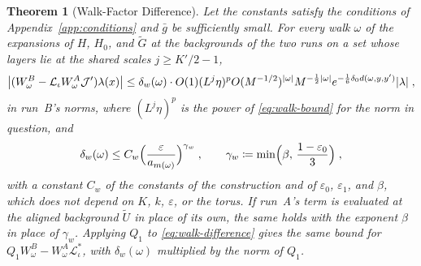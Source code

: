 \documentclass[11pt]{preprint}
\DeclarePairedDelimiter{\abs}{\lvert}{\rvert}
\numberwithin{equation}{section}
\newtheorem{theorem}{Theorem}[section]
\theoremstyle{definition}
\theoremstyle{remark}
\theoremstyle{plain}
\begin{document}
\begin{theorem}[Walk-Factor Difference]\label{thm:walk-difference}
Let the constants satisfy the conditions of Appendix~\ref{app:conditions} and $\bar g$ be sufficiently small. For every walk $\omega$ of the expansions of $H$, $H_0$, and $\tilde G$ at the backgrounds of the two runs on a set whose layers lie at the shared scales $j \geq K'/2 - 1$,
\begin{equation}\label{eq:walk-difference}
    \bigl\lvert(W^B_\omega - \mathcal L_\iota W^A_\omega\mathcal J')\lambda(x)\bigr\rvert \leq \delta_w(\omega)\cdot O(1)(L^j\eta)^pO(M^{-1/2})^{\abs{\omega}}M^{-\frac12\abs{\omega}}e^{-\frac16\delta_0d(\omega, y, y')}\abs{\lambda}\;,
\end{equation}
in run~B's norms, where $(L^j\eta)^p$ is the power of \eqref{eq:walk-bound} for the norm in question, and
\begin{equation}\label{eq:walk-defect}
    \delta_w(\omega) \leq C_w\Bigl(\frac{\varepsilon}{a_{m(\omega)}}\Bigr)^{\gamma_w}\;,
    \qquad
    \gamma_w \coloneqq \min\Bigl(\beta,\, \frac{1 - \varepsilon_0}{3}\Bigr)\;,
\end{equation}
with a constant $C_w$ of the constants of the construction and of $\varepsilon_0$, $\varepsilon_1$, and $\beta$, which does not depend on $K$, $k$, $\varepsilon$, or the torus. If run~A's term is evaluated at the aligned background $\tilde U$ in place of its own, the same holds with the exponent $\beta$ in place of $\gamma_w$. Applying $Q_1$ to \eqref{eq:walk-difference} gives the same bound for $Q_1W^B_\omega - W^A_\omega\mathcal L_\iota^*$, with $\delta_w(\omega)$ multiplied by the norm of $Q_1$.
\end{theorem}
\end{document}
